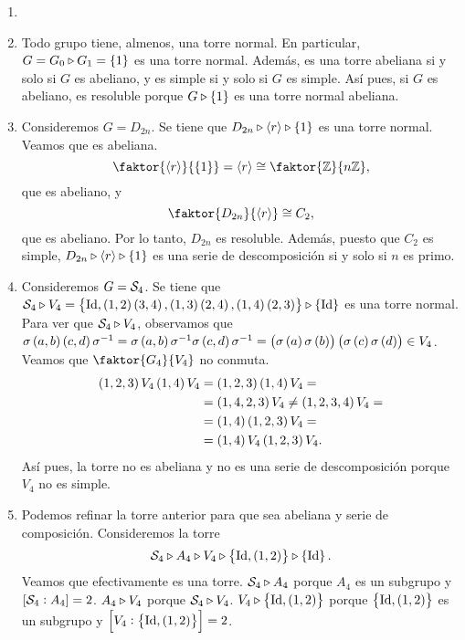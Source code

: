 \begin{example}
    \begin{enumerate}[1.]
        \item[]
        \item Todo grupo tiene, almenos, una torre normal. En particular, $G=G_0\triangleright G_1=\left\{ 1\right\}$ es una torre normal. Además, es una torre abeliana si y solo si $G$ es abeliano, y es simple si y solo si $G$ es simple. Así pues, si $G$ es abeliano, es resoluble porque $G\triangleright \left\{ 1\right\}$ es una torre normal abeliana.
        \item Consideremos $G=D_{2n}$. Se tiene que $D_{2n}\triangleright \left<r\right> \triangleright\left\{ 1\right\}$ es una torre normal. Veamos que es abeliana.
            \[
                \faktor{\left< r\right>}{\lc 1\rc}=\left< r\right>\cong \faktor{\z}{n\z},
            \]
            que es abeliano, y
            \[
                \faktor{D_{2n}}{\left< r\right>}\cong C_2,
            \]
            que es abeliano. Por lo tanto, $D_{2n}$ es resoluble. Además, puesto que $C_2$ es simple, $D_{2n}\triangleright \left<r\right> \triangleright\left\{ 1\right\}$ es una serie de descomposición si y solo si $n$ es primo.
        \item Consideremos $G=\mathcal{S}_4$. Se tiene que $\mathcal{S}_4\triangleright V_4=\left\{ \operatorname{Id}, \left( 1, 2\right)\left( 3,4\right),\left( 1,3\right)\left( 2,4\right),\left( 1,4\right)\left( 2,3\right)\right\}\triangleright\left\{ \operatorname{Id}\right\}$ es una torre normal. Para ver que $\mathcal{S}_4\triangleright V_4$, observamos que $\sigma\left( a, b\right)\left( c, d\right)\sigma^{-1}=\sigma\left( a, b\right)\sigma^{-1}\sigma\left( c, d\right)\sigma^{-1}=\left(\sigma\left( a\right)\sigma\left( b\right)\right)\left(\sigma\left( c\right)\sigma\left( d\right)\right)\in V_4$. Veamos que $\faktor{G_4}{V_4}$ no conmuta.
        \begin{align*}
            \left( 1,2,3\right) V_4\left( 1,4\right) V_4 &= \left( 1,2,3\right)\left( 1,4\right) V_4 = \\
            &= \left( 1,4,2,3\right) V_4 \neq \left( 1,2,3,4\right) V_4 =\\
            &= \left( 1,4\right)\left( 1,2,3\right) V_4 = \\
            &= \left( 1,4\right) V_4\left( 1,2,3\right) V_4.
        \end{align*}
        Así pues, la torre no es abeliana y no es una serie de descomposición porque $V_4$ no es simple.
        \item Podemos refinar la torre anterior para que sea abeliana y serie de composición. Consideremos la torre
            \[
                \mathcal{S}_4\triangleright A_4 \triangleright V_4 \triangleright \left\{ \operatorname{Id}, \left( 1,2\right) \right\}\triangleright\left\{ \operatorname{Id}\right\}.
            \]
            Veamos que efectivamente es una torre. $\mathcal{S}_4\triangleright A_4$ porque $A_4$ es un subgrupo y $\left[ \mathcal{S}_4 : A_4\right]=2$. $A_4\triangleright V_4$ porque $\mathcal{S}_4\triangleright V_4$. $V_4\triangleright \left\{ \operatorname{Id}, \left( 1,2\right) \right\}$ porque $\left\{ \operatorname{Id}, \left( 1,2\right) \right\}$ es un subgrupo y $\left[ V_4 : \left\{ \operatorname{Id}, \left( 1,2\right) \right\}\right]=2$.
    \end{enumerate}
\end{example}
